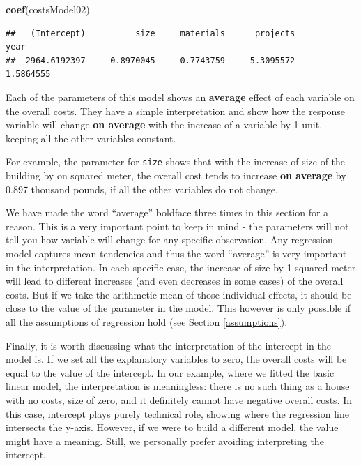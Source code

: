 \documentclass[
]{book}
\newenvironment{Shaded}{\begin{snugshade}}{\end{snugshade}}
\newcommand{\FunctionTok}[1]{\textcolor[rgb]{0.13,0.29,0.53}{\textbf{#1}}}
\newcommand{\NormalTok}[1]{#1}
\theoremstyle{definition}
\theoremstyle{definition}
\theoremstyle{definition}
\theoremstyle{definition}
\theoremstyle{remark}
\begin{document}
\begin{Shaded}
\begin{Highlighting}[]
\FunctionTok{coef}\NormalTok{(costsModel02)}
\end{Highlighting}
\end{Shaded}

\begin{verbatim}
##   (Intercept)          size     materials      projects          year 
## -2964.6192397     0.8970045     0.7743759    -5.3095572     1.5864555
\end{verbatim}

Each of the parameters of this model shows an \textbf{average} effect of each variable on the overall costs. They have a simple interpretation and show how the response variable will change \textbf{on average} with the increase of a variable by 1 unit, keeping all the other variables constant.

For example, the parameter for \texttt{size} shows that with the increase of size of the building by on squared meter, the overall cost tends to increase \textbf{on average} by 0.897 thousand pounds, if all the other variables do not change.

We have made the word ``average'' boldface three times in this section for a reason. This is a very important point to keep in mind - the parameters will not tell you how variable will change for any specific observation. Any regression model captures mean tendencies and thus the word ``average'' is very important in the interpretation. In each specific case, the increase of size by 1 squared meter will lead to different increases (and even decreases in some cases) of the overall costs. But if we take the arithmetic mean of those individual effects, it should be close to the value of the parameter in the model. This however is only possible if all the assumptions of regression hold (see Section \ref{assumptions}).

Finally, it is worth discussing what the interpretation of the intercept in the model is. If we set all the explanatory variables to zero, the overall costs will be equal to the value of the intercept. In our example, where we fitted the basic linear model, the interpretation is meaningless: there is no such thing as a house with no costs, size of zero, and it definitely cannot have negative overall costs. In this case, intercept plays purely technical role, showing where the regression line intersects the y-axis. However, if we were to build a different model, the value might have a meaning. Still, we personally prefer avoiding interpreting the intercept.
\end{document}
